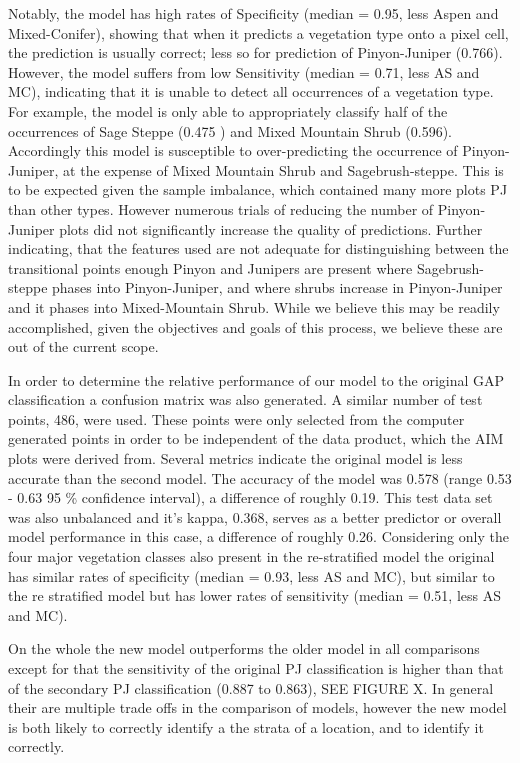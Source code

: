 \documentclass[
]{article}
\begin{document}
Notably, the model has high rates of Specificity (median = 0.95, less
Aspen and Mixed-Conifer), showing that when it predicts a vegetation
type onto a pixel cell, the prediction is usually correct; less so for
prediction of Pinyon-Juniper (0.766). However, the model suffers from
low Sensitivity (median = 0.71, less AS and MC), indicating that it is
unable to detect all occurrences of a vegetation type. For example, the
model is only able to appropriately classify half of the occurrences of
Sage Steppe (0.475 ) and Mixed Mountain Shrub (0.596). Accordingly this
model is susceptible to over-predicting the occurrence of
Pinyon-Juniper, at the expense of Mixed Mountain Shrub and
Sagebrush-steppe. This is to be expected given the sample imbalance,
which contained many more plots PJ than other types. However numerous
trials of reducing the number of Pinyon-Juniper plots did not
significantly increase the quality of predictions. Further indicating,
that the features used are not adequate for distinguishing between the
transitional points enough Pinyon and Junipers are present where
Sagebrush-steppe phases into Pinyon-Juniper, and where shrubs increase
in Pinyon-Juniper and it phases into Mixed-Mountain Shrub. While we
believe this may be readily accomplished, given the objectives and goals
of this process, we believe these are out of the current scope.

In order to determine the relative performance of our model to the
original GAP classification a confusion matrix was also generated. A
similar number of test points, 486, were used. These points were only
selected from the computer generated points in order to be independent
of the data product, which the AIM plots were derived from. Several
metrics indicate the original model is less accurate than the second
model. The accuracy of the model was 0.578 (range 0.53 - 0.63 95 \%
confidence interval), a difference of roughly 0.19. This test data set
was also unbalanced and it's kappa, 0.368, serves as a better predictor
or overall model performance in this case, a difference of roughly 0.26.
Considering only the four major vegetation classes also present in the
re-stratified model the original has similar rates of specificity
(median = 0.93, less AS and MC), but similar to the re stratified model
but has lower rates of sensitivity (median = 0.51, less AS and MC).

On the whole the new model outperforms the older model in all
comparisons except for that the sensitivity of the original PJ
classification is higher than that of the secondary PJ classification
(0.887 to 0.863), SEE FIGURE X. In general their are multiple trade offs
in the comparison of models, however the new model is both likely to
correctly identify a the strata of a location, and to identify it
correctly.
\end{document}
